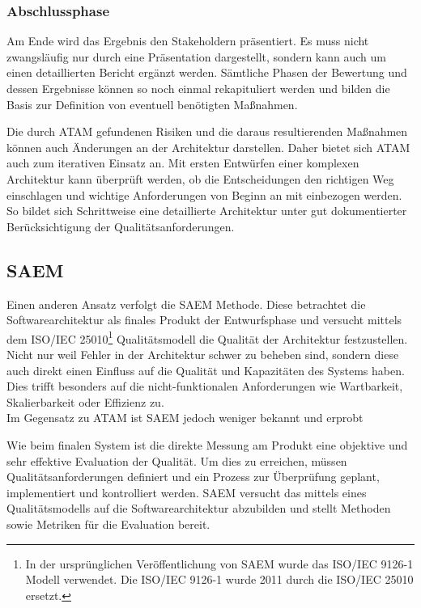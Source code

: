 \subsubsection{Abschlussphase}
Am Ende wird das Ergebnis den Stakeholdern präsentiert. Es muss nicht zwangsläufig nur durch eine Präsentation dargestellt, sondern kann auch um einen detaillierten Bericht ergänzt werden. Sämtliche Phasen der Bewertung und dessen Ergebnisse können so noch einmal rekapituliert werden und bilden die Basis zur Definition von eventuell benötigten Maßnahmen.

Die durch \ac{ATAM} gefundenen Risiken und die daraus resultierenden Maßnahmen können auch Änderungen an der Architektur darstellen. Daher bietet sich \ac{ATAM} auch zum iterativen Einsatz an. Mit ersten Entwürfen einer komplexen Architektur kann überprüft werden, ob die Entscheidungen den richtigen Weg einschlagen und wichtige Anforderungen von Beginn an mit einbezogen werden. So bildet sich Schrittweise eine detaillierte Architektur unter gut dokumentierter Berücksichtigung der Qualitätsanforderungen. 

\subsection{\acf*{SAEM}}
Einen anderen Ansatz verfolgt die \ac{SAEM} Methode. Diese betrachtet die Softwarearchitektur als finales Produkt der Entwurfsphase und versucht mittels dem ISO/IEC 25010\footnote{
	In der ursprünglichen Veröffentlichung von \ac{SAEM} wurde das ISO/IEC 9126-1 Modell verwendet. Die ISO/IEC 9126-1 wurde 2011 durch die ISO/IEC 25010 ersetzt.
}
Qualitätsmodell die Qualität der Architektur festzustellen. Nicht nur weil Fehler in der Architektur schwer zu beheben sind, sondern diese auch direkt einen Einfluss auf die Qualität und Kapazitäten des Systems haben\cite{Duenas1998}. Dies trifft besonders auf die nicht-funktionalen Anforderungen wie Wartbarkeit, Skalierbarkeit oder Effizienz zu.\\
Im Gegensatz zu \ac{ATAM} ist \ac{SAEM} jedoch weniger bekannt und erprobt\cite{IEEE_TSE2002}

Wie beim finalen System ist die direkte Messung am Produkt eine objektive und sehr effektive Evaluation der Qualität. Um dies zu erreichen, müssen Qualitätsanforderungen definiert und ein Prozess zur Überprüfung geplant, implementiert und kontrolliert werden\cite{Duenas1998}. \ac{SAEM} versucht das mittels eines Qualitätsmodells auf die Softwarearchitektur abzubilden und stellt Methoden sowie Metriken für die Evaluation bereit. 


